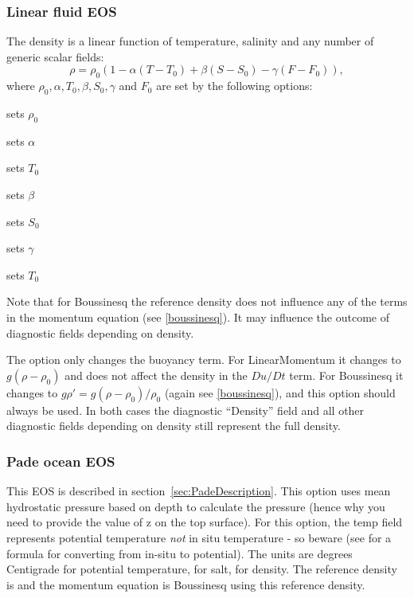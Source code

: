 \subsubsection{Linear fluid EOS}
The density is a linear function of temperature, salinity and any number of generic scalar fields:
\begin{equation}
  \rho=\rho_0 \left(1-\alpha(T-T_0)+\beta (S-S_0) - \gamma (F - F_0) \right),
\end{equation}
where $\rho_0, \alpha, T_0, \beta, S_0, \gamma$ and $F_0$ are set by the following 
options:
\begin{description}
\item {} sets $\rho_0$
\item {} sets $\alpha$
\item {} sets $T_0$
\item {} sets $\beta$
\item {} sets $S_0$
\item {} sets $\gamma$
\item {} sets $T_0$
\end{description}
Note that for Boussinesq the reference density does not 
influence any of the terms in the 
momentum equation (see \eqref{boussinesq}). It may influence the outcome
of diagnostic fields depending on density.

The option  only changes 
the buoyancy term. For LinearMomentum it changes to 
$g(\rho-\rho_0)$ and does not affect the density in the $Du/Dt$ term. For
Boussinesq it changes to 
$g\rho'=g(\rho-\rho_0)/\rho_0$ (again see \eqref{boussinesq}), 
and this option should always be used.
In both cases the diagnostic
``Density'' field and all other diagnostic fields depending on density
still represent the full density.

\subsubsection{Pade ocean EOS}
This EOS is described in section~\ref{sec:PadeDescription}.
This option uses mean hydrostatic pressure based on depth to calculate the
pressure (hence why you need to provide the value of z on the top surface).
For this option, the temp field represents potential temperature \emph{not} in
situ temperature - so beware (see \citet{mcdougall2003} for a formula for converting
from in-situ to potential). The units are degrees Centigrade for potential
temperature, \PSU{} for salt, \kgmm{} for density. The reference density is
\kgmm[1000] and the momentum equation is Boussinesq using this reference density.

